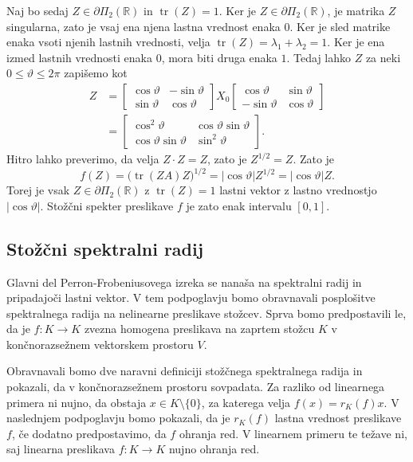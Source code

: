 \documentclass[mat2, tisk]{fmfdelo}
\newcommand{\R}{\mathbb{R}}
\begin{document}
\begin{zgled}
Naj bo sedaj $Z\in\partial\Pi_2(\R)$ in $\operatorname{tr}(Z)=1$. 
Ker je $Z \in \partial \Pi_2(\mathbb{R})$, je matrika $Z$ singularna, zato je vsaj ena
njena lastna vrednost enaka $0$.
Ker je sled matrike enaka vsoti njenih lastnih vrednosti, velja
$\operatorname{tr}(Z)=\lambda_1+\lambda_2=1$.
Ker je ena izmed lastnih vrednosti enaka $0$, mora biti druga enaka $1$.
Tedaj
lahko $Z$ za neki $0\leq\vartheta\leq2\pi$ zapišemo kot
\[
\begin{aligned}
Z
&=
\begin{bmatrix}
\cos\vartheta&-\sin\vartheta\\
\sin\vartheta&\cos\vartheta
\end{bmatrix}
X_0
\begin{bmatrix}
\cos\vartheta&\sin\vartheta\\
-\sin\vartheta&\cos\vartheta
\end{bmatrix}\\
&=
\begin{bmatrix}
\cos^2\vartheta&\cos\vartheta\sin\vartheta\\
\cos\vartheta\sin\vartheta&\sin^2\vartheta
\end{bmatrix}.
\end{aligned}
\]
Hitro lahko preverimo, da velja $Z \cdot Z=Z$, zato je $Z^{1/2}=Z$. Zato je
\[
f(Z)
=
\bigl(\operatorname{tr}(ZA)Z\bigr)^{1/2}
=
|\cos\vartheta|Z^{1/2}
=
|\cos\vartheta|Z.
\]
Torej je vsak $Z\in\partial\Pi_2(\R)$ z $\operatorname{tr}(Z)=1$
lastni vektor z lastno vrednostjo $|\cos\vartheta|$. Stožčni spekter
preslikave $f$ je zato enak intervalu $[0,1]$.
\end{zgled}










\subsection{Stožčni spektralni radij}

Glavni del Perron-Frobeniusovega izreka se nanaša na spektralni radij
in pripadajoči lastni vektor. V tem podpoglavju bomo obravnavali
posplošitve spektralnega radija na nelinearne preslikave stožcev.
Sprva bomo predpostavili le, da je $f\colon K\longrightarrow K$ zvezna
homogena preslikava na zaprtem stožcu $K$ v
končnorazsežnem vektorskem prostoru $V$.

Obravnavali bomo dve naravni definiciji stožčnega
spektralnega radija in pokazali, da v končnorazsežnem
prostoru sovpadata. Za razliko od
linearnega primera ni nujno, da obstaja $x\in K\setminus\{0\}$, za
katerega velja $f(x)=r_K(f)x$. V naslednjem podpoglavju bomo pokazali,
da je $r_K(f)$ lastna vrednost preslikave $f$, če dodatno
predpostavimo, da $f$ ohranja red. V linearnem primeru te težave ni,
saj linearna preslikava $f\colon K\longrightarrow K$ nujno ohranja red.
\end{document}
